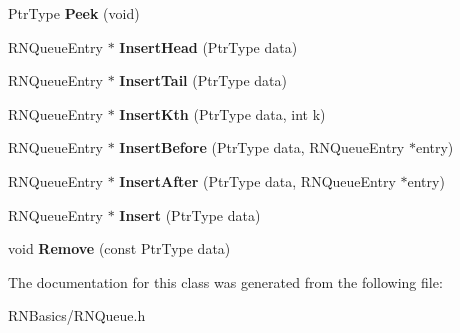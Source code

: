 \begin{DoxyCompactItemize}
\item 
Ptr\+Type {\bfseries Peek} (void)\hypertarget{class_r_n_queue_a9cbf4ad5251e91e171839c4aa43cf3b1}{}\label{class_r_n_queue_a9cbf4ad5251e91e171839c4aa43cf3b1}

\item 
R\+N\+Queue\+Entry $\ast$ {\bfseries Insert\+Head} (Ptr\+Type data)\hypertarget{class_r_n_queue_a7d7d38af80af961aaef0e7371cedc845}{}\label{class_r_n_queue_a7d7d38af80af961aaef0e7371cedc845}

\item 
R\+N\+Queue\+Entry $\ast$ {\bfseries Insert\+Tail} (Ptr\+Type data)\hypertarget{class_r_n_queue_a42e0aef6e365da05d5a1c00687bba737}{}\label{class_r_n_queue_a42e0aef6e365da05d5a1c00687bba737}

\item 
R\+N\+Queue\+Entry $\ast$ {\bfseries Insert\+Kth} (Ptr\+Type data, int k)\hypertarget{class_r_n_queue_aad29ab9f7cae997ca3899a18dbb3bd66}{}\label{class_r_n_queue_aad29ab9f7cae997ca3899a18dbb3bd66}

\item 
R\+N\+Queue\+Entry $\ast$ {\bfseries Insert\+Before} (Ptr\+Type data, R\+N\+Queue\+Entry $\ast$entry)\hypertarget{class_r_n_queue_adf6f27931c38726a93daa1740d0552bc}{}\label{class_r_n_queue_adf6f27931c38726a93daa1740d0552bc}

\item 
R\+N\+Queue\+Entry $\ast$ {\bfseries Insert\+After} (Ptr\+Type data, R\+N\+Queue\+Entry $\ast$entry)\hypertarget{class_r_n_queue_a44a70b2fa4a9593ef449f46ff5a15389}{}\label{class_r_n_queue_a44a70b2fa4a9593ef449f46ff5a15389}

\item 
R\+N\+Queue\+Entry $\ast$ {\bfseries Insert} (Ptr\+Type data)\hypertarget{class_r_n_queue_a0340958810082dc9486bfaff0980902f}{}\label{class_r_n_queue_a0340958810082dc9486bfaff0980902f}

\item 
void {\bfseries Remove} (const Ptr\+Type data)\hypertarget{class_r_n_queue_a6793ba0abd50b004648e03cf1496d9be}{}\label{class_r_n_queue_a6793ba0abd50b004648e03cf1496d9be}

\end{DoxyCompactItemize}


The documentation for this class was generated from the following file\+:\begin{DoxyCompactItemize}
\item 
R\+N\+Basics/R\+N\+Queue.\+h\end{DoxyCompactItemize}
